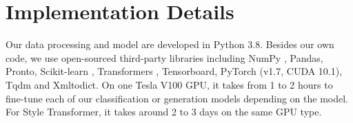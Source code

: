 \documentclass[acmsmall]{acmart}
\begin{document}
\section{Implementation Details} 

Our data processing and model are developed in Python 3.8. Besides our own code, we use open-sourced third-party libraries including NumPy \citep{harris2020array}, Pandas, Pronto, Scikit-learn \citep{scikit-learn}, Transformers \citep{Wolf2019HuggingFacesTS}, Tensorboard, PyTorch \citep{NEURIPS2019_bdbca288} (v1.7, CUDA 10.1), Tqdm and Xmltodict. On one Tesla V100 GPU, it takes from 1 to 2 hours to fine-tune each of our classification or generation models depending on the model. For Style Transformer, it takes around 2 to 3 days on the same GPU type.
\end{document}
